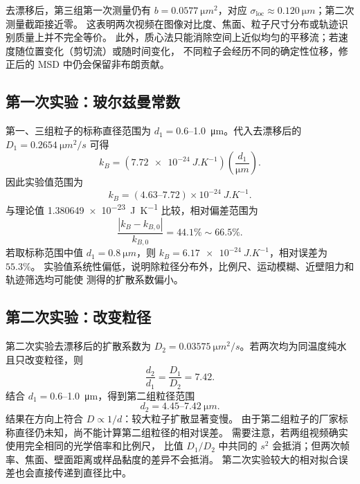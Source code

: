 \documentclass[11pt]{article}
\begin{document}
去漂移后，第三组第一次测量仍有
$b=\SI{0.0577}{\micro m^2}$，对应
$\sigma_{\mathrm{loc}}\approx\SI{0.120}{\micro m}$；第二次测量截距接近零。
这表明两次视频在图像对比度、焦面、粒子尺寸分布或轨迹识别质量上并不完全等价。
此外，质心法只能消除空间上近似均匀的平移流；若速度随位置变化（剪切流）或随时间变化，
不同粒子会经历不同的确定性位移，修正后的 MSD 中仍会保留非布朗贡献。

\subsection{第一次实验：玻尔兹曼常数}

第一、三组粒子的标称直径范围为
$d_1=0.6$--\SI{1.0}{\micro m}。代入去漂移后的
$D_1=\SI{0.2654}{\micro m^2/s}$ 可得
\begin{equation}
    k_B=\left(\SI{7.72e-24}{J.K^{-1}}\right)
    \left(\frac{d_1}{\si{\micro m}}\right).
\end{equation}
因此实验值范围为
\begin{equation}
    k_B=(4.63\text{--}7.72)\times10^{-24}\ \si{J.K^{-1}}.
\end{equation}
与理论值 \SI{1.380649e-23}{J.K^{-1}} 比较，相对偏差范围为
\begin{equation}
    \frac{|k_B-k_{B,0}|}{k_{B,0}}
    =44.1\%\sim66.5\%.
\end{equation}
若取标称范围中值 $d_1=\SI{0.8}{\micro m}$，则
$k_B=\SI{6.17e-24}{J.K^{-1}}$，相对误差为 $55.3\%$。
实验值系统性偏低，说明除粒径分布外，比例尺、运动模糊、近壁阻力和轨迹筛选均可能使
测得的扩散系数偏小。

\subsection{第二次实验：改变粒径}

第二次实验去漂移后的扩散系数为
$D_2=\SI{0.03575}{\micro m^2/s}$。若两次均为同温度纯水且只改变粒径，则
\begin{equation}
    \frac{d_2}{d_1}=\frac{D_1}{D_2}=7.42.
\end{equation}
结合 $d_1=0.6$--\SI{1.0}{\micro m}，得到第二组粒径范围
\begin{equation}
    d_2=4.45\text{--}7.42\ \si{\micro m}.
\end{equation}
结果在方向上符合 $D\propto 1/d$：较大粒子扩散显著变慢。
由于第二组粒子的厂家标称直径仍未知，尚不能计算第二组粒径的相对误差。
需要注意，若两组视频确实使用完全相同的光学倍率和比例尺，
比值 $D_1/D_2$ 中共同的 $s^2$ 会抵消；但两次帧率、焦面、壁面距离或样品黏度的差异不会抵消。
第二次实验较大的相对拟合误差也会直接传递到直径比中。
\end{document}
